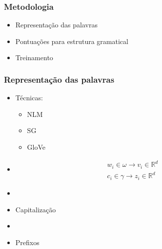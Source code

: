 \documentclass[10pt]{beamer}
\begin{document}
\begin{frame}[fragile]
  \frametitle{Metodologia}

  \begin{itemize}
    \item Representação das palavras
    \item Pontuações para estrutura gramatical
    \item Treinamento
  \end{itemize}
  

\end{frame}


\begin{frame}[fragile]
\frametitle{Representação das palavras}


  \begin{itemize}

    \item[-] Técnicas:
    \begin{itemize}
      \item[-] NLM
      \item[-] SG
      \item[-] GloVe
    \end{itemize}

    \item[\ ] \begin{align} \nonumber 
    w_i \in \omega \to v_i \in \mathbb{R}^d \\
    c_i \in \gamma \to z_i \in \mathbb{R}^d \nonumber 
    \end{align}

    \item[\ ] \ 

    \item[-] Capitalização

    \item[\ ] \ 

    \item[-] Prefixos

  \end{itemize}

\end{frame}
\end{document}
